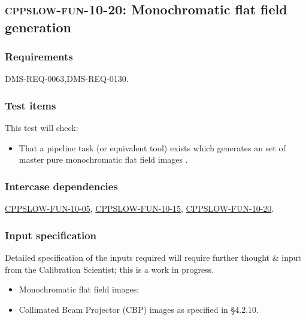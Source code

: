 \subsection{\textsc{cppslow-fun-10-20}: Monochromatic flat field generation}
\label{cppslow-fun-10-20}

\subsubsection{Requirements}

DMS-REQ-0063,DMS-REQ-0130.

\subsubsection{Test items}

This test will check:

\begin{itemize}

  \item{That a pipeline task (or equivalent tool) exists which generates an
  set of master pure monochromatic flat field images .}

\end{itemize}

\subsubsection{Intercase dependencies}

\hyperref[cppslow-fun-10-05]{CPPSLOW-FUN-10-05},
\hyperref[cppslow-fun-10-15]{CPPSLOW-FUN-10-15},
\hyperref[cppslow-fun-10-15]{CPPSLOW-FUN-10-20}.

\subsubsection{Input specification}

\begin{note}
Detailed specification of the inputs required will require further thought \&
input from the Calibration Scientist; this is a work in progress.
\end{note}

\begin{itemize}

  \item{Monochromatic flat field images;}
  \item{Collimated Beam Projector (CBP) images as specified in 
  \S4.2.10.}

\end{itemize}

